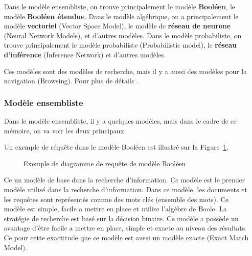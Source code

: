 Dans le modèle ensembliste, on trouve principalement le modèle \textbf{Booléen}, le modèle \textbf{Booléen étendue}. Dans le modèle algébrique, on a principalement le modèle \textbf{vectoriel} (Vector Space Model), le modèle de \textbf{réseau de neurone} (Neural Network Models), et d'autres modèles. Dans le modèle probabiliste, on trouve principalement le modèle probabiliste (Probabilistic model), le \textbf{réseau d'inférence} (Inference Network) et d'autres modèles.

Ces modèles sont des modèles de recherche, mais il y a aussi des modèles pour la navigation (Browsing). Pour plus de détails \citep{modern-ir}.

\subsubsection{Modèle ensembliste}
Dans le modèle ensembliste, il y a quelques modèles, mais dans le cadre de ce mémoire, on va voir les deux principaux.

Un exemple de réquête dans le modèle Booléen est illustré sur la Figure~\ref{fig:boolean-model}.

\begin{figure}[htbp]
    \begin{center}
    \end{center}
    \caption{Exemple de diagramme de requête de modèle Booléen \citep{model-ir}}
    \label{fig:boolean-model}
\end{figure}

Ce un modèle de base dans la recherche d'information. Ce modèle est le premier modèle utilisé dans la recherche d'information. Dans ce modèle, les documents et les requêtes sont représentés comme des mots clés (ensemble des mots). Ce modèle est simple, facile a mettre en place et utilise l'algèbre de Boole. La stratégie de recherche est basé sur la décision binaire.
Ce modèle a possède un avantage d'être facile a mettre en place, simple et exacte au niveau des résultats. Ce pour cette exactitude que ce modèle est aussi un modèle exacte (Exact Match Model).

